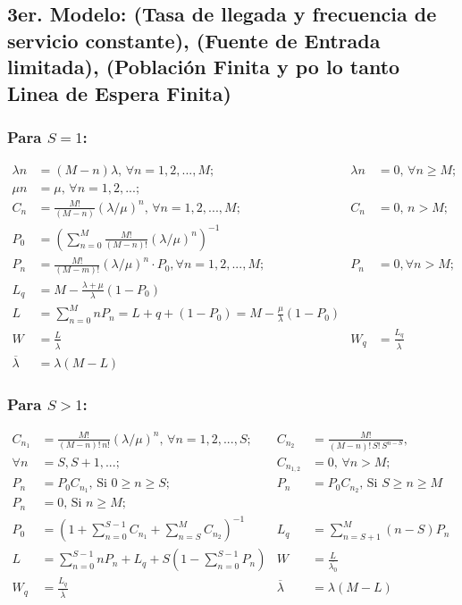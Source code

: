 \documentclass[letterpaper, 12pt]{article}
\begin{document}
\begin{justify}
    \subsection*{3er. Modelo: (Tasa de llegada y frecuencia de servicio constante), (Fuente de Entrada limitada), (Población Finita y po lo tanto Linea de Espera Finita)}
    \subsubsection*{Para \(S=1\):}
    \large{
    \begin{align*}
\lambda n&=(M-n)\lambda,\,\forall n=1,2,...,M;&\lambda n&=0,\,\forall n\geq M;\\
\mu n&=\mu,\,\forall n=1,2,...;\\
C_n&=\frac{M!}{(M-n)}(\lambda/\mu)^n,\,\forall n=1,2,...,M;&C_n&=0,\,n>M;\\
P_0&=\left(\sum_{n=0}^{M} \frac{M!}{(M-n)!}(\lambda/\mu)^n\right)^{-1}\\
P_n&=\frac{M!}{(M-m)!}(\lambda/\mu)^n\cdot P_0,\forall n=1,2,...,M;&P_n&=0, \forall n>M;\\
L_q&=M-\frac{\lambda+\mu}{\lambda}(1-P_0)\\
L&=\sum_{n=0}^{M} nP_n=L+q+(1-P_0)=M-\frac{\mu}{\lambda}(1-P_0)\\
W&=\frac{L}{\overline{\lambda}}&W_q&=\frac{L_q}{\overline{\lambda}}\\
\overline{\lambda}&=\lambda(M-L)
    \end{align*}
    }
    \subsubsection*{Para \(S>1\):}
    \large{
    \begin{align*}
C_{n_1}&=\frac{M!}{(M-n)!\,n!}(\lambda/\mu)^n,\,\forall n=1,2,...,S;&C_{n_2}&=\frac{M!}{(M-n)!\,S!\,S^{n-S}},\\
\forall n&=S,S+1,...;&C_{n_{1,2}}&=0,\,\forall n>M;&\\
P_n&=P_0C_{n_1},\,\text{Si } 0\geq n\geq S;&P_n&=P_0C_{n_2},\,\text{Si } S\geq n\geq M\\
P_n&=0,\,\text{Si } n\geq M;& &\\
P_0&=\left(1+\sum_{n=0}^{S-1} C_{n_1}+\sum_{n=S}^{M} C_{n_2}\right)^{-1}&L_q&=\sum_{n=S+1}^{M} (n-S)P_n\\
L&=\sum_{n=0}^{S-1} nP_n+L_q+S(1-\sum_{n=0}^{S-1} P_n)&W&=\frac{L}{\overline{\lambda_0}}\\
W_q&=\frac{L_q}{\overline{\lambda}}&\overline{\lambda}&=\lambda(M-L)
    \end{align*}
    }
    \newpage

\end{justify}
\end{document}

